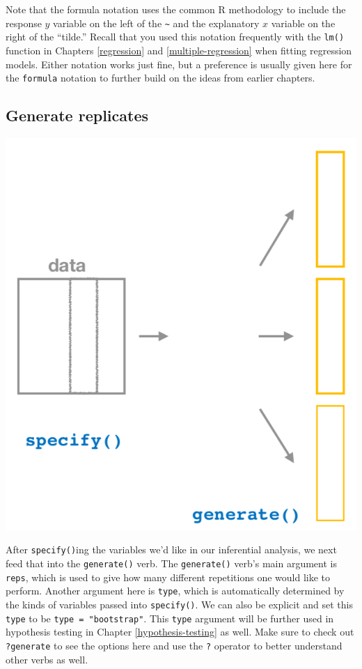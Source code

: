 \documentclass[12pt,]{krantz}
\theoremstyle{definition}
\theoremstyle{definition}
\theoremstyle{definition}
\theoremstyle{remark}
\begin{document}
Note that the formula notation uses the common R methodology to include
the response \(y\) variable on the left of the
\texttt{\textasciitilde{}} and the explanatory \(x\) variable on the
right of the ``tilde.'' Recall that you used this notation frequently
with the \texttt{lm()} function in Chapters \ref{regression} and
\ref{multiple-regression} when fitting regression models. Either
notation works just fine, but a preference is usually given here for the
\texttt{formula} notation to further build on the ideas from earlier
chapters.

\subsection{Generate replicates}\label{generate-replicates}

\begin{center}\includegraphics[width=\textwidth]{images/flowcharts/infer/generate} \end{center}

After \texttt{specify()}ing the variables we'd like in our inferential
analysis, we next feed that into the \texttt{generate()} verb. The
\texttt{generate()} verb's main argument is \texttt{reps}, which is used
to give how many different repetitions one would like to perform.
Another argument here is \texttt{type}, which is automatically
determined by the kinds of variables passed into \texttt{specify()}. We
can also be explicit and set this \texttt{type} to be
\texttt{type\ =\ "bootstrap"}. This \texttt{type} argument will be
further used in hypothesis testing in Chapter \ref{hypothesis-testing}
as well. Make sure to check out \texttt{?generate} to see the options
here and use the \texttt{?} operator to better understand other verbs as
well.
\end{document}
